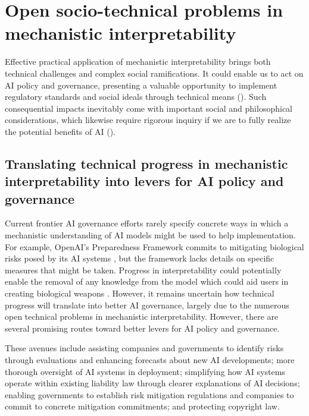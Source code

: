 \section{Open socio-technical problems in mechanistic interpretability}
\label{sec:open-problems-sociotechnical}

Effective practical application of mechanistic interpretability brings both technical challenges and complex social ramifications. It could enable us to act on AI policy and governance, presenting a valuable opportunity to implement regulatory standards and social ideals through technical means (). Such consequential impacts inevitably come with important social and philosophical considerations, which likewise require rigorous inquiry if we are to fully realize the potential benefits of AI ().


\subsection{Translating technical progress in mechanistic interpretability into levers for AI policy and governance}
\label{subsec:technical-progress}

Current frontier AI governance efforts rarely specify concrete ways in which a mechanistic understanding of AI models might be used to help implementation. For example, OpenAI's Preparedness Framework commits to mitigating biological risks posed by its AI systems \citep{openai2023preparedness}, but the framework lacks details on specific measures that might be taken. Progress in interpretability could potentially enable the removal of any knowledge from the model which could aid users in creating biological weapons \citep{li2024wmdp}. However, it remains uncertain how technical progress will translate into better AI governance, largely due to the numerous open technical problems in mechanistic interpretability. However, there are several promising routes toward better levers for AI policy and governance.

These avenues include assisting companies and governments to identify risks through evaluations and enhancing forecasts about new AI developments; more thorough oversight of AI systems in deployment; simplifying how AI systems operate within existing liability law through clearer explanations of AI decisions; enabling governments to establish risk mitigation regulations and companies to commit to concrete mitigation commitments; and protecting copyright law.

